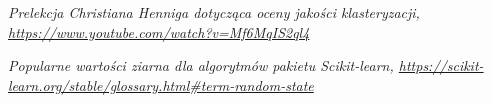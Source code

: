 \documentclass[a4paper,11pt]{article}
\begin{document}

\newpage
\begin{thebibliography}{0}

    \textsl{Prelekcja Christiana Henniga dotycząca oceny jakości klasteryzacji, \url{https://www.youtube.com/watch?v=Mf6MqIS2ql4}}

    \textsl{Popularne wartości ziarna dla algorytmów pakietu Scikit-learn, \url{https://scikit-learn.org/stable/glossary.html\#term-random-state}}
    
\end{thebibliography}
\end{document}
